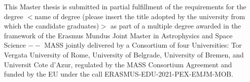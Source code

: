\documentclass{article}
\begin{document}
\newpage
\vspace*{\fill}
This Master thesis is submitted in partial fulfillment of the requirements
for the degree $<$name of degree (please insert the title adopted by the
university from which the candidate graduates)$>$ as part of a multiple
degree awarded in the framework of the Erasmus Mundus Joint Master
in Astrophysics and Space Science $--$ MASS jointly delivered by a Consortium of four Universities: Tor Vergata University of Rome, University
of Belgrade, University of Bremen, and Universit  Cote d'Azur,
regulated by the MASS Consortium Agreement and funded by the EU
under the call ERASMUS-EDU-2021-PEX-EMJM-MOB.
\vspace*{\fill}

\newpage


\newpage
{}










\end{document}

